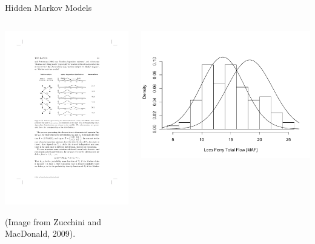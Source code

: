 \documentclass[final,x11names]{beamer}
\begin{document}
\begin{frame}{}
\begin{columns}
\begin{column}{.33\linewidth}
\begin{block}{Hidden Markov Models}
		

			\begin{columns}
				\begin{column}{.58\textwidth}
					\centering
					\includegraphics[width=.8\textwidth]{figs/hmm-diagram.pdf}
					
					(\small{Image from Zucchini and MacDonald, 2009}). 
				\end{column}
				\begin{column}{.38\textwidth}
					\includegraphics[width=\textwidth]{figs/hmm-2state-pdf.pdf}
					

\end{column}
\end{columns}
\end{block}
\end{column}
\end{columns}
\end{frame}
\end{document}
